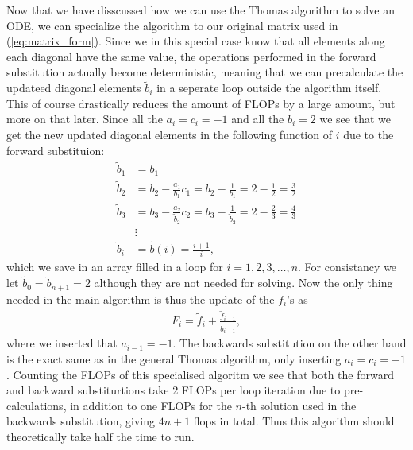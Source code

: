 \documentclass[twocolumn]{aastex62}
\begin{document}
Now that we have disscussed how we can use the Thomas algorithm to solve an ODE, we can specialize the algorithm to our original matrix used in (\ref{eq:matrix_form}). Since we in this special case know that all elements along each diagonal have the same value, the operations performed in the forward substitution actually become deterministic, meaning that we can precalculate the updateed diagonal elements $\tilde{b}_i$ in a seperate loop outside the algorithm itself. This of course drastically reduces the amount of FLOPs by a large amount, but more on that later. Since all the $a_i = c_i = -1$ and all the $b_i = 2$ we see that we get the new updated diagonal elements in the following function of $i$ due to the forward substituion:
\begin{align}
	\tilde{b}_1 &= b_1\\
	\tilde{b}_2 &= b_2 - \frac{a_1}{b_1}c_1 = b_2 - \frac{1}{b_1} = 2 - \frac{1}{2} = \frac{3}{2}\\
	\tilde{b}_3 &= b_3 - \frac{a_2}{\tilde{b}_2}c_2 = b_3 - \frac{1}{\tilde{b}_2} = 2 - \frac{2}{3} = \frac{4}{3}\\
	&\vdots\\
	\tilde{b}_i &= \tilde{b}(i) = \frac{i + 1}{i},
\end{align} 
which we save in an array filled in a loop for $i = 1, 2, 3,\ldots, n$. For consistancy we let $\tilde{b}_0 = \tilde{b}_{n+1} = 2$ although they are not needed for solving. Now the only thing needed in the main algorithm is thus the update of the $f_i$'s as 
\begin{align}
	F_i = \tilde{f}_i + \frac{\tilde{f}_{i-1}}{\tilde{b}_{i-1}},
\end{align}
where we inserted that $a_{i-1} = -1$.
The backwards substitution on the other hand is the exact same as in the general Thomas algorithm, only inserting $a_i = c_i = -1$.
Counting the FLOPs of this specialised algoritm we see that both the forward and backward substiturtions take 2 FLOPs per loop iteration due to pre-calculations, in addition to one FLOPs for the $n$-th solution used in the backwards substitution, giving $4n + 1$ flops in total. Thus this algorithm should theoretically take half the time to run.
\end{document}

